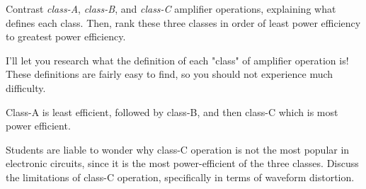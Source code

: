 

Contrast {\it class-A}, {\it class-B}, and {\it class-C} amplifier operations, explaining what defines each class.  Then, rank these three classes in order of least power efficiency to greatest power efficiency.







I'll let you research what the definition of each "class" of amplifier operation is!  These definitions are fairly easy to find, so you should not experience much difficulty.

Class-A is least efficient, followed by class-B, and then class-C which is most power efficient.







Students are liable to wonder why class-C operation is not the most popular in electronic circuits, since it is the most power-efficient of the three classes.  Discuss the limitations of class-C operation, specifically in terms of waveform distortion.




